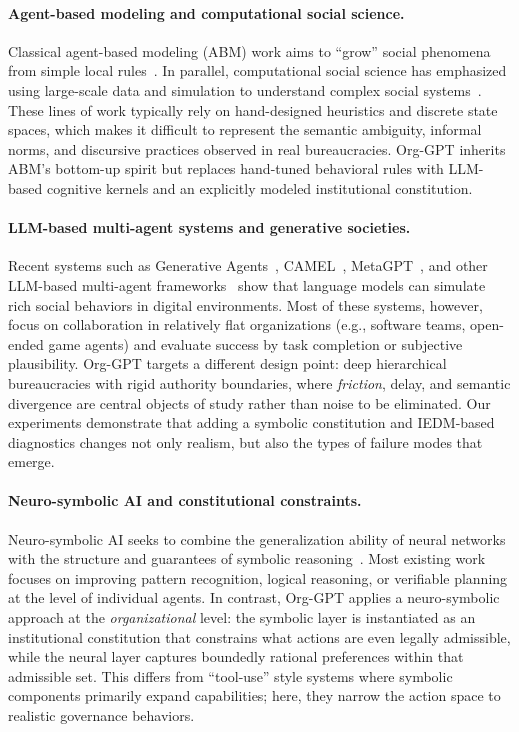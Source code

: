 \documentclass{article}
\begin{document}
\paragraph{Agent-based modeling and computational social science.}
Classical agent-based modeling (ABM) work aims to ``grow'' social phenomena from simple local rules~\citep{epstein1999generative,epstein2006generative,conte2012manifesto}. In parallel, computational social science has emphasized using large-scale data and simulation to understand complex social systems~\citep{lazer2009computational,castellano2009statistical}. These lines of work typically rely on hand-designed heuristics and discrete state spaces, which makes it difficult to represent the semantic ambiguity, informal norms, and discursive practices observed in real bureaucracies. Org-GPT inherits ABM's bottom-up spirit but replaces hand-tuned behavioral rules with LLM-based cognitive kernels and an explicitly modeled institutional constitution.

\paragraph{LLM-based multi-agent systems and generative societies.}
Recent systems such as Generative Agents~\citep{park2023generative}, CAMEL~\citep{li2023camel}, MetaGPT~\citep{hong2023metagpt}, and other LLM-based multi-agent frameworks~\citep{gao2024llmabm,wang2024llmagents} show that language models can simulate rich social behaviors in digital environments. Most of these systems, however, focus on collaboration in relatively flat organizations (e.g., software teams, open-ended game agents) and evaluate success by task completion or subjective plausibility. Org-GPT targets a different design point: deep hierarchical bureaucracies with rigid authority boundaries, where \emph{friction}, delay, and semantic divergence are central objects of study rather than noise to be eliminated. Our experiments demonstrate that adding a symbolic constitution and IEDM-based diagnostics changes not only realism, but also the types of failure modes that emerge.

\paragraph{Neuro-symbolic AI and constitutional constraints.}
Neuro-symbolic AI seeks to combine the generalization ability of neural networks with the structure and guarantees of symbolic reasoning~\citep{hitzler2022nesy_book,badreddine2020ltn,bengio2019system}. Most existing work focuses on improving pattern recognition, logical reasoning, or verifiable planning at the level of individual agents. In contrast, Org-GPT applies a neuro-symbolic approach at the \emph{organizational} level: the symbolic layer is instantiated as an institutional constitution that constrains what actions are even legally admissible, while the neural layer captures boundedly rational preferences within that admissible set. This differs from ``tool-use'' style systems where symbolic components primarily expand capabilities; here, they narrow the action space to realistic governance behaviors.
\end{document}
